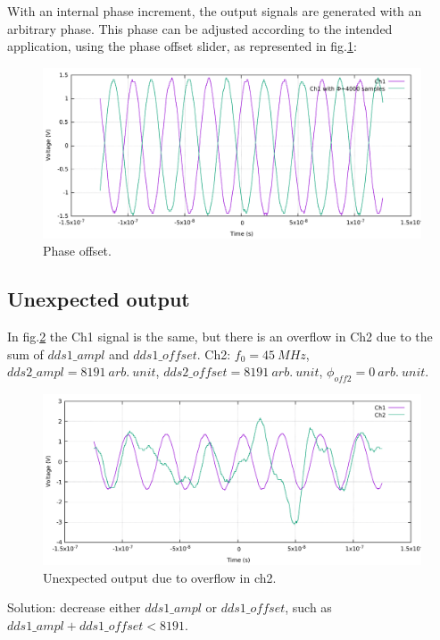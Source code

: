 \documentclass[12pt,oneside]{article}
\begin{document}
With an internal phase increment, the output signals are generated with an arbitrary phase. This phase can be adjusted according to the intended application, using the phase offset slider, as represented in fig.\ref{fig:doubleDDSphase}:

\begin{figure}[h!tb]
	\begin{center}
		\includegraphics[width=14cm]{scope/doubleDDSokPhi.pdf}
		\caption{Phase offset.}
		\label{fig:doubleDDSphase}
	\end{center}
\end{figure}

\vspace{-1cm}
\subsection{Unexpected output}\label{subsect:doubleDDSpasOk}

In fig.\ref{fig:doubleDDSpasOk} the Ch1 signal is the same, but there is an overflow in Ch2 due to the sum of $dds1\_ampl$ and $dds1\_offset$. \newline
Ch2: $f_0=45~MHz$, $dds2\_ampl=8191~arb.~unit$, $dds2\_offset=8191~arb.~unit$, \newline $\phi_{off2}=0~arb.~unit$.

\begin{figure}[!h!tb]
	\begin{center}
		\includegraphics[width=14cm]{scope/doubleDDSpasOk.pdf}
		\caption{Unexpected output due to overflow in ch2.}
		\label{fig:doubleDDSpasOk}
	\end{center}
\end{figure}
Solution: decrease either $dds1\_ampl$ or $dds1\_offset$, such as ${dds1\_ampl + dds1\_offset < 8191}$.
\end{document}
